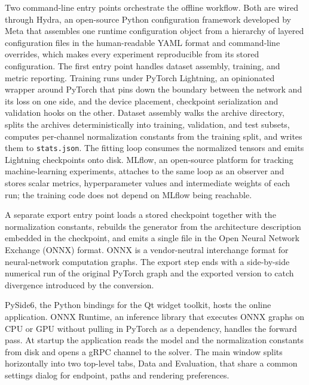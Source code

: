 Two command-line entry points orchestrate the offline workflow. Both are wired through Hydra, an open-source Python configuration framework developed by Meta that assembles one runtime configuration object from a hierarchy of layered configuration files in the human-readable YAML format and command-line overrides, which makes every experiment reproducible from its stored configuration. The first entry point handles dataset assembly, training, and metric reporting. Training runs under PyTorch Lightning, an opinionated wrapper around PyTorch that pins down the boundary between the network and its loss on one side, and the device placement, checkpoint serialization and validation hooks on the other. Dataset assembly walks the archive directory, splits the archives deterministically into training, validation, and test subsets, computes per-channel normalization constants from the training split, and writes them to \texttt{stats.json}. The fitting loop consumes the normalized tensors and emits Lightning checkpoints onto disk. MLflow, an open-source platform for tracking machine-learning experiments, attaches to the same loop as an observer and stores scalar metrics, hyperparameter values and intermediate weights of each run; the training code does not depend on MLflow being reachable.

A separate export entry point loads a stored checkpoint together with the normalization constants, rebuilds the generator from the architecture description embedded in the checkpoint, and emits a single file in the Open Neural Network Exchange (ONNX) format. ONNX is a vendor-neutral interchange format for neural-network computation graphs. The export step ends with a side-by-side numerical run of the original PyTorch graph and the exported version to catch divergence introduced by the conversion.

PySide6, the Python bindings for the Qt widget toolkit, hosts the online application. ONNX Runtime, an inference library that executes ONNX graphs on CPU or GPU without pulling in PyTorch as a dependency, handles the forward pass. At startup the application reads the model and the normalization constants from disk and opens a gRPC channel to the solver. The main window splits horizontally into two top-level tabs, Data and Evaluation, that share a common settings dialog for endpoint, paths and rendering preferences.

